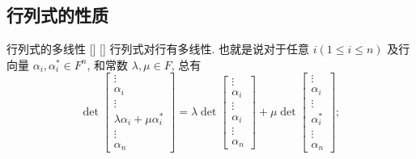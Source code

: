 \documentclass[UTF8]{ctexart}
\DeclareMathOperator{\0}{\mathbf{0}}
\DeclareMathOperator{\<}{\langle}
\renewcommand{\>}{\rangle}
\begin{document}
	\subsection{行列式的性质}
        \begin{thm}
			[]
			{行列式的多线性}
			[]
			[]
        行列式对行有多线性. 也就是说对于任意  \(i (1 \leq i \leq n)\)  及行向量  \(\alpha_i, \alpha_i^* \in F^n\), 和常数  \(\lambda, \mu \in F\), 总有 
        \[
        \det \left[ \begin{array}{c}
        \vdots \\
        \alpha_{i} \\
        \vdots \\
        \lambda \alpha_i + \mu \alpha_i^* \\
        \vdots \\
        \alpha_n
        \end{array} \right]
        =
        \lambda \det \left[ \begin{array}{c}
        \vdots \\
        \alpha_{i} \\
        \vdots \\
        \alpha_i \\
        \vdots \\
        \alpha_n
        \end{array} \right]
        + \mu \det \left[ \begin{array}{c}
        \vdots \\
        \alpha_{i} \\
        \vdots \\
        \alpha_i^* \\
        \vdots \\
        \alpha_n
        \end{array} \right];
        \]
        \end{thm}
\end{document}
